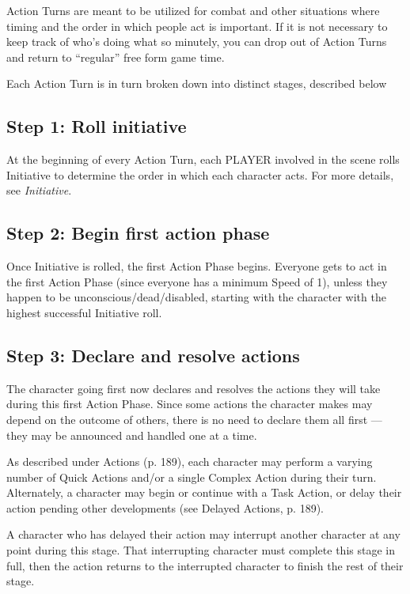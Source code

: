 Action Turns are meant to be utilized for combat and other situations where timing and the order in which people act is important. If it is not necessary to keep track of who’s doing what so minutely, you can drop out of Action Turns and return to ``regular'' free form game time. 

Each Action Turn is in turn broken down into distinct stages, described below 



\subsection{Step 1: Roll initiative} \label{sec:roll-initiative} 

At the beginning of every Action Turn, each PLAYER involved in the scene rolls Initiative to determine the order in which each character acts. For more details, see \emph{Initiative}. 



\subsection{Step 2: Begin first action phase} \label{sec:begin-first-phase} 

Once Initiative is rolled, the first Action Phase begins. Everyone gets to act in the first Action Phase (since everyone has a minimum Speed of 1), unless they happen to be unconscious/dead/disabled, starting with the character with the highest successful Initiative roll. 



\subsection{Step 3: Declare and resolve actions} \label{sec:declare-resolve} 

The character going first now declares and resolves the actions they will take during this first Action Phase. Since some actions the character makes may depend on the outcome of others, there is no need to declare them all first --- they may be announced and handled one at a time. 

As described under Actions (p. 189), each character may perform a varying number of Quick Actions and/or a single Complex Action during their turn. Alternately, a character may begin or continue with a Task Action, or delay their action pending other developments (see Delayed Actions, p. 189). 

A character who has delayed their action may interrupt another character at any point during this stage. That interrupting character must complete this stage in full, then the action returns to the interrupted character to finish the rest of their stage. 



